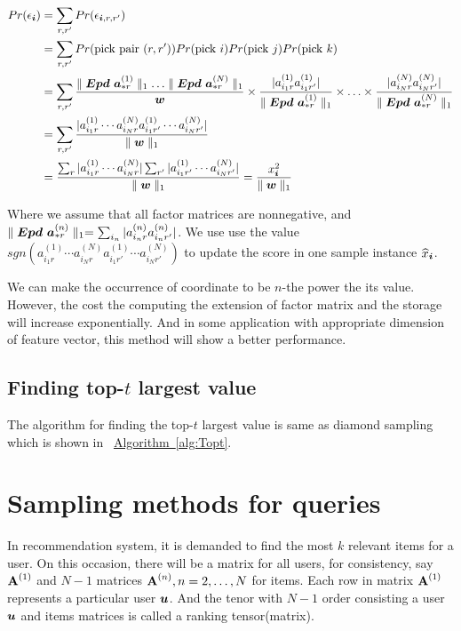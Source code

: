 \documentclass[letterpaper]{article}
\newcommand{\Sca}[3]{{#1}^{(#2)}_{i_#2#3}}%
\newcommand{\V}[1]{{\bm{{\MakeLowercase{#1}}}}}
\newcommand{\Vacol}[1]{\V{a}^{(#1)}_{*r}}
\newcommand{\M}[1]{{\bm{\mathbf{\MakeUppercase{#1}}}}}
\newcommand{\norm}[2]{\parallel#1\parallel_{#2}}
\newcommand{\Alg}[1] {\hyperref[alg:#1] {Algorithm~\ref*{alg:#1}}}
\begin{document}
\begin{align*}
Pr(\epsilon_{\V{i}}) &= \sum_{r,r'} Pr(\epsilon_{\V{i},r,r'})\\
&= \sum_{r,r'} Pr({\rm pick\ pair\ }(r,r'))Pr({\rm pick\ }i)Pr({\rm pick\ }j)Pr({\rm pick\ }k)\\
&= \sum_{r,r'} \frac{\norm{\bm{Epd}\ \Vacol{1}}{1}\ldots\norm{\bm{Epd}\ \Vacol{N}}{1}}{\V{w}}\times
\frac{|\Sca{a}{1}{r}\Sca{a}{1}{r'}|}{\norm{\bm{Epd}\ \Vacol{1}}{1}} \times\ldots\times
\frac{|\Sca{a}{N}{r}\Sca{a}{N}{r'}|}{\norm{\bm{Epd}\ \Vacol{N}}{1}} \\
& = \sum_{r,r'} \frac{|\Sca{a}{1}{r}\cdots\Sca{a}{N}{r}\Sca{a}{1}{r'}\cdots\Sca{a}{N}{r'}|}{\norm{\V{W}}{1}}\\
& = \frac{\sum_{r}|\Sca{a}{1}{r}\cdots\Sca{a}{N}{r}|\sum_{r'} |\Sca{a}{1}{r'}\cdots\Sca{a}{N}{r'}|}{\norm{\V{W}}{1}} = \frac{x_{\V{i}}^2}{\norm{\V{w}}{1}}
\end{align*}

Where we assume that all factor matrices are nonnegative, and $\norm{\bm{Epd}\ \Vacol{n}}{1} = \sum_{i_n}|\Sca{a}{n}{r}\Sca{a}{n}{r'}|$. We use use the value $sgn(\Sca{a}{1}{r}\cdots\Sca{a}{N}{r}\Sca{a}{1}{r'}\cdots\Sca{a}{N}{r'})$ to update the score in one sample instance $\widehat{x}_{\V{i}}$.

We can make the occurrence of coordinate to be $n$-the power the its value. However, the cost the computing the extension of factor matrix and the storage will increase exponentially. And in some application with appropriate dimension of feature vector, this method will show a better performance.


\subsection{Finding top-$t$ largest value}

The algorithm for finding the top-$t$ largest value is same as diamond sampling which is shown in ~\Alg{Topt}.


\section{Sampling methods for queries}

In recommendation system, it is demanded to find the most $k$ relevant items for a user. On this occasion, there will be a matrix for all users, for consistency, say $\M{A}^{(1)}$ and $N-1$ matrices $\M{A}^{(n)},n=2,\ldots,N$ for items. Each row in matrix $\M{A}^{(1)}$ represents a particular user $\V{u}$. And the tenor with $N-1$ order consisting a user $\V{u}$ and items matrices is called a ranking tensor(matrix).
\end{document}
